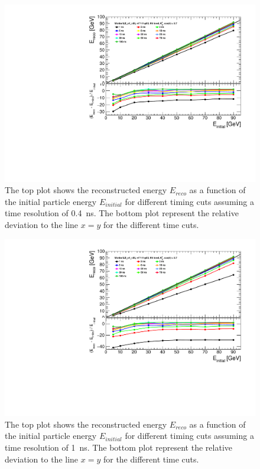 \begin{figure}[htbp!]
  \centering
  \includegraphics[width=0.7\linewidth]{../Thesis_Plots/ILD/Smearing_0.4ns/Plots/Linearity_TimeCuts_Smearing1}
  \caption{The top plot shows the reconstructed energy $E_{reco}$ as a function of the initial particle energy $E_{initial}$ for different timing cuts assuming a time resolution of \SI{0.4}{\nano\second}. The bottom plot represent the relative deviation to the line $x=y$ for the different time cuts.} \label{fig:Lin0.4ns}
\end{figure}

\begin{figure}[htbp!]
  \centering
  \includegraphics[width=0.7\linewidth]{../Thesis_Plots/ILD/Smearing_1ns/Plots/Linearity_TimeCuts_Smearing2}
  \caption{The top plot shows the reconstructed energy $E_{reco}$ as a function of the initial particle energy $E_{initial}$ for different timing cuts assuming a time resolution of \SI{1}{\nano\second}. The bottom plot represent the relative deviation to the line $x=y$ for the different time cuts.} \label{fig:Lin1ns}
\end{figure}

